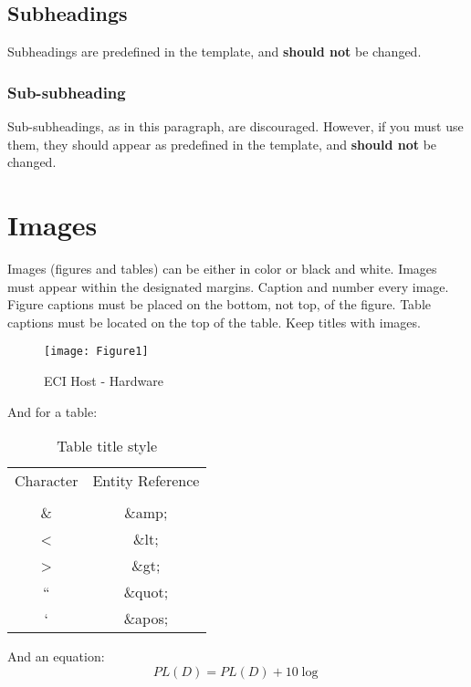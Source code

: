 \documentclass[10pt,a4paper,twocolumn]{article}
\def\starttable{\vspace{6pt}\begin{table}[ht]\center}
\def\startfigure{\vspace{6pt}\begin{figure}[ht]\center}
\begin{document}
\subsection{Subheadings}
\label{ssec:sec5.1}
Subheadings are predefined in the template, and \textbf{should not} be changed.

\subsubsection{Sub-subheading}
\label{sssec:sec5.1.1}
Sub-subheadings, as in this paragraph, are discouraged.
However, if you must use them, they should appear as predefined in the template, and \textbf{should not} be changed.


\section{Images}
\label{sec:sec6}
Images (figures and tables) can be either in color or black and white.
Images must appear within the designated margins.
Caption and number every image.
Figure captions must be placed on the bottom, not top, of the figure.
Table captions must be located on the top of the table.
Keep titles with images. 

\startfigure
\texttt{[image: Figure1]}
\caption{ECI Host - Hardware}\label{fig:fig1} 
\end{figure}

And for a table:
\starttable
\caption{Table title style}\label{tab:tab1} 
\begin{small}
\begin{tabu}{|c|c|}
\hline
 \rowfont{\bfseries}Character & Entity Reference\\ 
  & \\
\hline
\hline
\& & \&amp; \\
\hline
 < & \&lt;\\
 \hline
 > & \&gt; \\
\hline
``  & \&quot; \\
\hline
 ` & \&apos; \\
\hline
\end{tabu}
\end{small}
\end{table}

And an equation:
\begin{equation}\label{eq:eq1}
PL(D)=PL(D)+10\log 
\end{equation}
\end{document}
